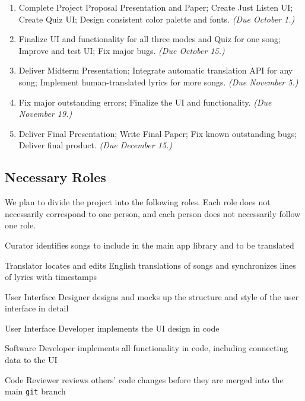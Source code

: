 \documentclass[conference, 12pt]{IEEEtran}
\begin{document}
\begin{enumerate}[label=Phase \arabic*., leftmargin=*]
\item Complete Project Proposal Presentation and Paper; Create Just Listen UI; Create Quiz UI; Design consistent color palette and fonts. \textit{(Due October 1.)}

\item Finalize UI and functionality for all three modes and Quiz for one song; Improve and test UI; Fix major bugs. \textit{(Due October 15.)}

\item Deliver Midterm Presentation; Integrate automatic translation API for any song; Implement human-translated lyrics for more songs. \textit{(Due November 5.)}

\item Fix major outstanding errors; Finalize the UI and functionality. \textit{(Due November 19.)}

\item Deliver Final Presentation; Write Final Paper; Fix known outstanding bugs; Deliver final product. \textit{(Due December 15.)}
\end{enumerate}

\subsection{Necessary Roles}
We plan to divide the project into the following roles. 
Each role does not necessarily correspond to one person, and each person does not necessarily follow one role.

\begin{LaTeXdescription}
\item[Curator] identifies songs to include in the main app library and to be translated
\item[Translator] locates and edits English translations of songs and synchronizes lines of lyrics with timestamps
\item[User Interface Designer] designs and mocks up the structure and style of the user interface in detail
\item[User Interface Developer] implements the UI design in code
\item[Software Developer] implements all functionality in code, including connecting data to the UI
\item[Code Reviewer] reviews others' code changes before they are merged into the main \verb+git+ branch
\end{LaTeXdescription}
\end{document}
